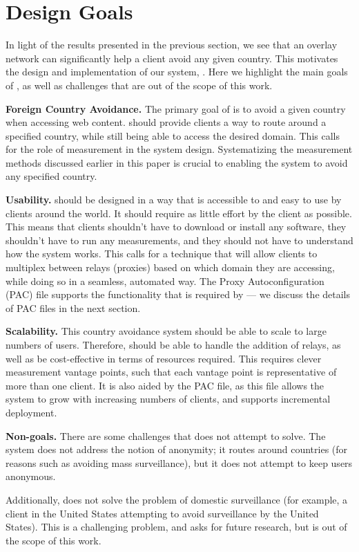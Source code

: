 \section{Design Goals}
\label{goals}
In light of the results presented in the previous section, we see that an 
overlay network can significantly help a client avoid any given country.  This motivates
 the design and implementation of our system, \system.  Here we highlight the main goals of 
\system{}, as well as challenges that are out of the scope of this work.

{\bf Foreign Country Avoidance.}  The primary goal of \system{} is to avoid a given
 country when accessing web content.  \system{} should provide clients a way to 
route around a specified country, while still being able to access the desired 
domain.  This calls for the role of measurement in the system design.  Systematizing 
the measurement methods discussed earlier in this paper is crucial to enabling the 
system to avoid any specified country.

{\bf Usability.} \system{} should be designed in a way that is accessible to and 
easy to use by clients around the world.  It should require as little effort by 
the client as possible.  This means that clients shouldn't have to download or 
install any software, they shouldn't have to run any measurements, and they 
should not have to understand how the system works.  This calls for a technique 
that will allow clients to multiplex between relays (proxies) based on which domain they 
are accessing, while doing so in a seamless, automated way.  The Proxy Autoconfiguration (PAC) 
file supports the functionality that is required by \system{} --- we discuss the details 
of PAC files in the next section.  

{\bf Scalability.}  This country avoidance system should be able to scale to 
large numbers of users.  Therefore, \system{} should be able to handle the addition
 of relays, as well as be cost-effective in terms of resources required. This requires 
clever measurement vantage points, such that each vantage point is representative of 
more than one client.  It is also aided by the PAC file, as this file allows the system to 
grow with increasing numbers of clients, and supports incremental deployment.

{\bf Non-goals.}  There are some challenges that \system{} does not attempt to 
solve.  The system does not address the notion of anonymity; it routes around 
countries (for reasons such as avoiding mass surveillance), but it does not 
attempt to keep users anonymous.  

Additionally, \system{} does not solve the problem of domestic surveillance (for 
example, a client in the United States attempting to avoid surveillance by the 
United States).  This is a challenging problem, and asks for future research, 
but is out of the scope of this work.
